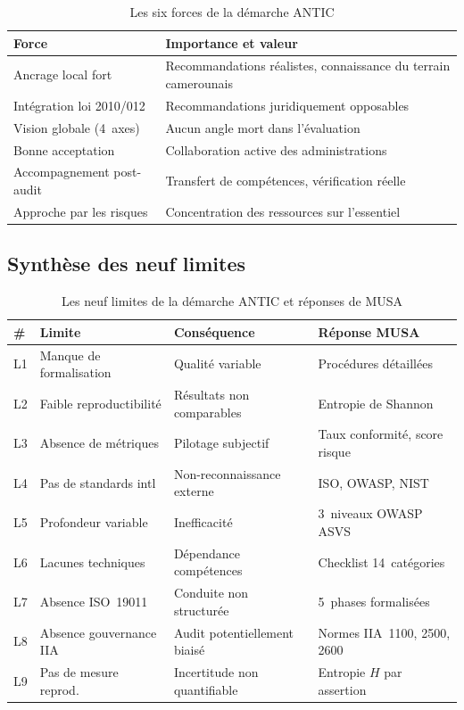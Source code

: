 \documentclass[12pt,a4paper,oneside]{report}
\begin{document}
\begin{table}[H]
\centering\small
\caption{Les six forces de la d\'emarche ANTIC}
\label{tab:forces}
\begin{tabularx}{\textwidth}{p{3.5cm}X}
\toprule
\rowcolor{theadcolor}
\color{white}\textbf{Force} &
\color{white}\textbf{Importance et valeur} \\
\midrule
Ancrage local fort &
  Recommandations r\'ealistes, connaissance du terrain camerounais \\
Int\'egration loi 2010/012 &
  Recommandations juridiquement opposables \\
Vision globale (4~axes) &
  Aucun angle mort dans l'\'evaluation \\
Bonne acceptation &
  Collaboration active des administrations \\
Accompagnement post-audit &
  Transfert de comp\'etences, v\'erification r\'eelle \\
Approche par les risques &
  Concentration des ressources sur l'essentiel \\
\bottomrule
\end{tabularx}
\end{table}

\subsection{Synth\`ese des neuf limites}

\begin{table}[H]
\centering\small
\caption{Les neuf limites de la d\'emarche ANTIC et r\'eponses de MUSA}
\label{tab:limites}
\begin{tabularx}{\textwidth}{p{0.5cm}p{4cm}p{3.5cm}X}
\toprule
\rowcolor{theadcolor}
\color{white}\textbf{\#} &
\color{white}\textbf{Limite} &
\color{white}\textbf{Cons\'equence} &
\color{white}\textbf{R\'eponse MUSA} \\
\midrule
L1 & Manque de formalisation & Qualit\'e variable &
  Proc\'edures d\'etaill\'ees \\
L2 & Faible reproductibilit\'e & R\'esultats non comparables &
  Entropie de Shannon \\
L3 & Absence de m\'etriques & Pilotage subjectif &
  Taux conformit\'e, score risque \\
L4 & Pas de standards intl & Non-reconnaissance externe &
  ISO, OWASP, NIST \\
L5 & Profondeur variable & Inefficacit\'e &
  3~niveaux OWASP ASVS \\
L6 & Lacunes techniques & D\'ependance comp\'etences &
  Checklist 14~cat\'egories \\
L7 & Absence ISO~19011 & Conduite non structur\'ee &
  5~phases formalis\'ees \\
L8 & Absence gouvernance IIA & Audit potentiellement biais\'e &
  Normes IIA~1100, 2500, 2600 \\
L9 & Pas de mesure reprod. & Incertitude non quantifiable &
  Entropie $H$ par assertion \\
\bottomrule
\end{tabularx}
\end{table}
\end{document}
